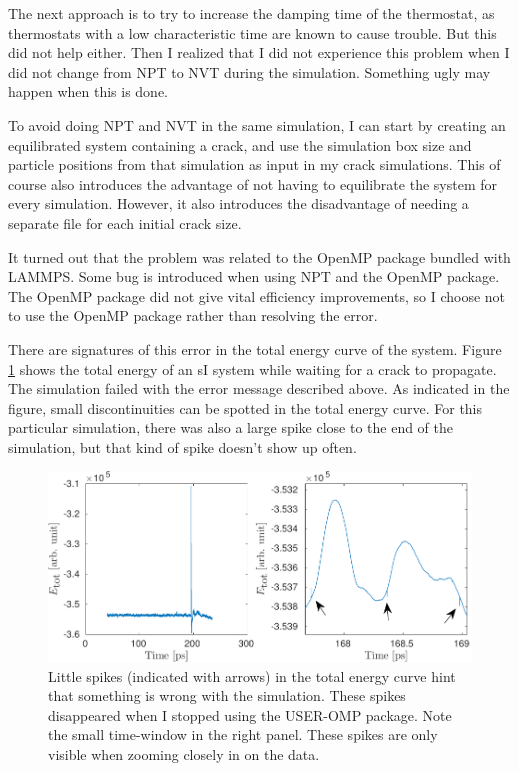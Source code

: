 The next approach is to try to increase the damping time of the thermostat, as thermostats with a low characteristic time are known to cause trouble. But this did not help either. Then I realized that I did not experience this problem when I did not change from NPT to NVT during the simulation. Something ugly may happen when this is done.

To avoid doing NPT and NVT in the same simulation, I can start by creating an equilibrated system containing a crack, and use the simulation box size and particle positions from that simulation as input in my crack simulations. This of course also introduces the advantage of not having to equilibrate the system for every simulation. However, it also introduces the disadvantage of needing a separate file for each initial crack size.

It turned out that the problem was related to the OpenMP package bundled with LAMMPS. Some bug is introduced when using NPT and the OpenMP package. The OpenMP package did not give vital efficiency improvements, so I choose not to use the OpenMP package rather than resolving the error.

There are signatures of this error in the total energy curve of the system. Figure \ref{fig:toteng_omp_bug} shows the total energy of an sI system while waiting for a crack to propagate. The simulation failed with the error message described above. As indicated in the figure, small discontinuities can be spotted in the total energy curve. For this particular simulation, there was also a large spike close to the end of the simulation, but that kind of spike doesn't show up often.

\begin{figure}
\centering
\includegraphics[width=\textwidth]{../figures/thesis/toteng_omp_bug.pdf}
\caption{Little spikes (indicated with arrows) in the total energy curve hint that something is wrong with the simulation. These spikes disappeared when I stopped using the USER-OMP package. Note the small time-window in the right panel. These spikes are only visible when zooming closely in on the data.}
\label{fig:toteng_omp_bug}
\end{figure}

